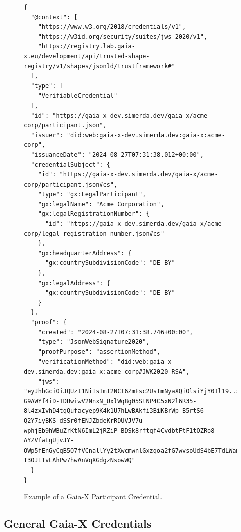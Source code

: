 \begin{figure}
    \centering
    \begin{verbatim}
{
  "@context": [
    "https://www.w3.org/2018/credentials/v1",
    "https://w3id.org/security/suites/jws-2020/v1",
    "https://registry.lab.gaia-x.eu/development/api/trusted-shape-registry/v1/shapes/jsonld/trustframework#"
  ],
  "type": [
    "VerifiableCredential"
  ],
  "id": "https://gaia-x-dev.simerda.dev/gaia-x/acme-corp/participant.json",
  "issuer": "did:web:gaia-x-dev.simerda.dev:gaia-x:acme-corp",
  "issuanceDate": "2024-08-27T07:31:38.012+00:00",
  "credentialSubject": {
    "id": "https://gaia-x-dev.simerda.dev/gaia-x/acme-corp/participant.json#cs",
    "type": "gx:LegalParticipant",
    "gx:legalName": "Acme Corporation",
    "gx:legalRegistrationNumber": {
      "id": "https://gaia-x-dev.simerda.dev/gaia-x/acme-corp/legal-registration-number.json#cs"
    },
    "gx:headquarterAddress": {
      "gx:countrySubdivisionCode": "DE-BY"
    },
    "gx:legalAddress": {
      "gx:countrySubdivisionCode": "DE-BY"
    }
  },
  "proof": {
    "created": "2024-08-27T07:31:38.746+00:00",
    "type": "JsonWebSignature2020",
    "proofPurpose": "assertionMethod",
    "verificationMethod": "did:web:gaia-x-dev.simerda.dev:gaia-x:acme-corp#JWK2020-RSA",
    "jws": "eyJhbGciOiJQUzI1NiIsImI2NCI6ZmFsc2UsImNyaXQiOlsiYjY0Il19..xoMpx55vYkhGFn3iRJInsxidCMmcnWi8DbX4L4DK-G9AWYf4iD-TDBwiwV2NnxN_UxlWq8g05StNP4C5xN2l6R35-8l4zxIvhD4tqQufacyep9K4k1U7hLwBAkfi3BiKBrWp-B5rtS6-Q2Y7iyBKS_dSSr0fENJZbdeKrRDUVJV7u-wphjEb9hWBuZrKtN6ImL2jRZiP-BDSk8rftqf4CvdbtFtF1tOZRo8-AYZVfwLgUjvJY-OWp5fEnGyCqB5O7fVCnallYy2tXwcmwnlGxzqoa2fG7wvsoUdS4bE7TdLWamF7m1aCce6-T3OJLTvLAhPw7hwAnVqXGdgzNsowWQ"
  }
}
    \end{verbatim}
    \caption{Example of a Gaia-X Participant Credential.}\label{fig:gaia_x_credential_example}
\end{figure}

\subsection{General Gaia-X Credentials}\label{subsec:general-gaia-x-credentials}

